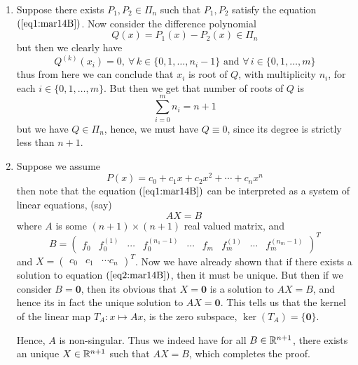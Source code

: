 \begin{prf}
    \begin{enumerate}
        \item[]Suppose there exists $P_1, P_2 \in \Pi_n$ such that $P_1, P_2$ satisfy the equation $(\ref{eq1:mar14B})$. Now consider the difference polynomial 
        \[
            Q(x) = P_1(x) - P_2(x) \in \Pi_n  
        \]  
        but then we clearly have 
        \[
            Q^{(k)}(x_i) = 0, \ \forall \, k \in \{0,1,\dots,n_i-1\} \mbox{ and } \forall \, i \in \{0,1,\dots,m\}
        \]
        thus from here we can conclude that $x_i$ is root of $Q$, with multiplicity $n_i$, for each $i \in \{0,1,\dots,m\}$. But then we get that number of roots of $Q$ is 
        \[
            \sum_{i=0}^m n_i = n+1  
        \]
        but we have $Q \in \Pi_n$, hence, we must have $Q \equiv 0$, since its degree is strictly less than $n+1$.

        \item[] Suppose we assume 
        \[
            P(x) = c_0 + c_1 x + c_2 x^2 + \cdots + c_n x^n     
        \] 
        then note that the equation $(\ref{eq1:mar14B})$ can be interpreted as a system of linear equations, (say) 
        \begin{equation}\label{eq2:mar14B}
            AX = B\
        \end{equation}
        where $A$ is some $(n+1) \times (n+1)$ real valued matrix, and \[B = \begin{pmatrix}
            f_0 & f_0^{(1)} & \cdots & f_0^{(n_1 -1)} & \cdots & f_m & f_m^{(1)} & \cdots & f_m^{(n_m-1)}
        \end{pmatrix}^T\]
        and $X = \begin{pmatrix}
            c_0 & c_1 & \cdots c_n 
        \end{pmatrix}^T$. Now we have already shown that if there exists a solution to equation $(\ref{eq2:mar14B})$, then it must be unique. But then if we consider $B = \mathbf{0}$, then its obvious that $ X = \mathbf{0}$ is a solution to $AX = B$, and hence its in fact the unique solution to $AX = \mathbf{0}$. This tells us that the kernel of the linear map $T_A : x \mapsto Ax$, is the zero subspace, $\ker(T_A) = \{\mathbf{0}\}$. 
        
        Hence, $A$ is non-singular. Thus we indeed have for all $B \in \mathbb{R}^{n+1}$, there exists an unique $X \in \mathbb{R}^{n+1}$ such that $AX = B$, which completes the proof.
    \end{enumerate}
\end{prf}

